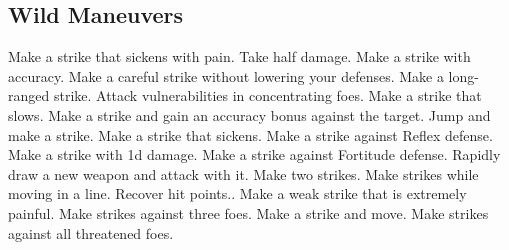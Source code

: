 \small
\subsection{Wild Maneuvers}\label{Wild Maneuvers}
\begin{spelllist}
 Make a strike that sickens with pain.
 Take half damage.
 Make a strike with  accuracy.
 Make a careful strike without lowering your defenses.
 Make a long-ranged strike.
 Attack vulnerabilities in concentrating foes.
 Make a strike that slows.
 Make a strike and gain an accuracy bonus against the target.
 Jump and make a strike.
 Make a strike that sickens.
 Make a strike against Reflex defense.
 Make a strike with \plus1d damage.
 Make a strike against Fortitude defense.
 Rapidly draw a new weapon and attack with it.
 Make two strikes.
 Make strikes while moving in a line.
 Recover hit points..
 Make a weak strike that is extremely painful.
 Make strikes against three foes.
 Make a strike and move.
 Make strikes against all threatened foes.
\end{spelllist}
